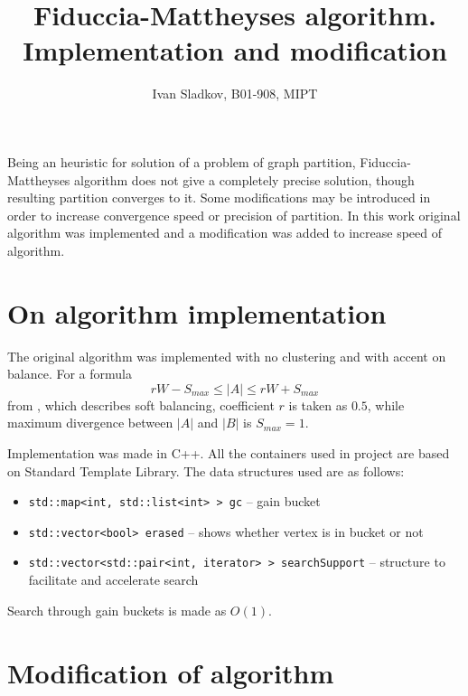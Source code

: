 \documentclass[12pt,a4paper,twocolumn]{article}
\title{Fiduccia-Mattheyses algorithm. Implementation and modification}
\author{Ivan Sladkov, B01-908, MIPT}
\begin{document}
	\maketitle
	
	Being an heuristic for solution of a problem of graph partition, Fiduccia-Mattheyses algorithm does not give a completely precise solution, though resulting partition converges to it. Some modifications may be introduced in order to increase convergence speed or precision of partition. In this work original algorithm was implemented and a modification was added to increase speed of algorithm.
	
	\section{On algorithm implementation}
	
	The original algorithm was implemented with no clustering and with accent on balance. For a formula  
	\begin{equation}\label{eq:usualBalance}
		r W - S_{max} \le \left| A \right| \le r W +S_{max}
	\end{equation}
	from %
	, which describes soft balancing, coefficient $r$ is taken as $0.5$, while maximum divergence between $| A |$ and $| B |$ is $S_{max} = 1$.
	
	Implementation was made in C++. All the containers used in project are based on Standard Template Library. The data structures used are as follows:
	\begin{itemize}
		\item \texttt{std::map<int, std::list<int> > gc} -- gain bucket 
		\item \texttt{std::vector<bool> erased} -- shows whether vertex is in bucket or not
		\item \texttt{std::vector<std::pair<int, iterator> > searchSupport} -- structure to facilitate and accelerate search
	\end{itemize}
	Search through gain buckets is made as $O(1)$.
	
	\section{Modification of algorithm}
	
\end{document}
